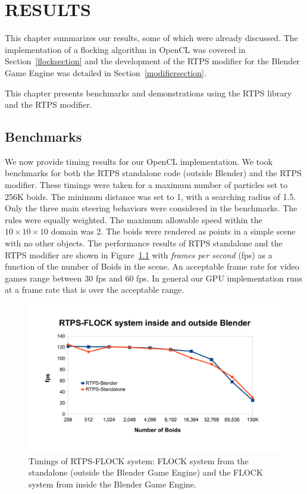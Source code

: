 \chapter{RESULTS}\label{resultsChapter}

This chapter summarizes our results, some of which were already discussed. The implementation of a flocking algorithm in OpenCL was covered in Section~\ref{flocksection} and the development of the RTPS modifier for the Blender Game Engine was detailed in Section~\ref{modifiersection}. 

This chapter presents benchmarks and demonstrations using the RTPS library and the RTPS modifier.

\section{Benchmarks}

We now provide timing results for our OpenCL implementation. We took benchmarks for both the RTPS standalone code (outside Blender) and the RTPS modifier. These timings were taken for a maximum number of particles set to 256K boids. The minimum distance was set to 1, with a searching radius of 1.5. Only the three main steering behaviors were considered in the benchmarks. The rules were equally weighted. The maximum allowable speed within the $10\times 10\times 10$ domain was 2. The boids were rendered as points in a simple scene with no other objects. The performance results of RTPS standalone and the RTPS modifier are shown in Figure~\ref{RTPSvsRTPS} with \textit{frames per second} (fps) as a function of the number of Boids in the scene. An acceptable frame rate for video games range between 30 fps and 60 fps. In general our GPU implementation runs at a frame rate that is over the acceptable range. 

\begin{figure}[htbp]
\begin{center}
\includegraphics[scale=0.7]{figures/RTPSvsRTPS.pdf}
\caption{Timings of RTPS-FLOCK system: FLOCK system from the standalone (outside the Blender Game Engine) and the FLOCK system from inside the Blender Game Engine.}
\label{RTPSvsRTPS}
\end{center}
\end{figure}

